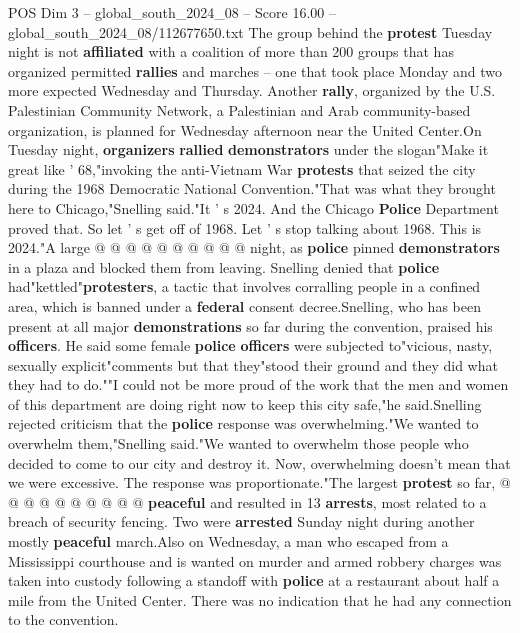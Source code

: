 \begin{textsample}{POS Dim 3 – global\_south\_2024\_08 – Score 16.00 – global\_south\_2024\_08/112677650.txt}
The group behind the \textbf{protest} Tuesday night is not \textbf{affiliated} with a coalition of more than 200 groups that has organized permitted \textbf{rallies} and marches -- one that took place Monday and two more expected Wednesday and Thursday.
Another \textbf{rally}, organized by the U.S.
Palestinian Community Network, a Palestinian and Arab community-based organization, is planned for Wednesday afternoon near the United Center.On Tuesday night, \textbf{organizers} \textbf{rallied} \textbf{demonstrators} under the slogan"Make it great like ' 68,"invoking the anti-Vietnam War \textbf{protests} that seized the city during the 1968 Democratic National Convention."That was what they brought here to Chicago,"Snelling said."It ' s 2024.
And the Chicago \textbf{Police} Department proved that.
So let ' s get off of 1968.
Let ' s stop talking about 1968.
This is 2024."A large @ @ @ @ @ @ @ @ @ @ night, as \textbf{police} pinned \textbf{demonstrators} in a plaza and blocked them from leaving.
Snelling denied that \textbf{police} had"kettled"\textbf{protesters}, a tactic that involves corralling people in a confined area, which is banned under a \textbf{federal} consent decree.Snelling, who has been present at all major \textbf{demonstrations} so far during the convention, praised his \textbf{officers}.
He said some female \textbf{police} \textbf{officers} were subjected to"vicious, nasty, sexually explicit"comments but that they"stood their ground and they did what they had to do.""I could not be more proud of the work that the men and women of this department are doing right now to keep this city safe,"he said.Snelling rejected criticism that the \textbf{police} response was overwhelming."We wanted to overwhelm them,"Snelling said."We wanted to overwhelm those people who decided to come to our city and destroy it.
Now, overwhelming doesn't mean that we were excessive.
The response was proportionate."The largest \textbf{protest} so far, @ @ @ @ @ @ @ @ @ @ \textbf{peaceful} and resulted in 13 \textbf{arrests}, most related to a breach of security fencing.
Two were \textbf{arrested} Sunday night during another mostly \textbf{peaceful} march.Also on Wednesday, a man who escaped from a Mississippi courthouse and is wanted on murder and armed robbery charges was taken into custody following a standoff with \textbf{police} at a restaurant about half a mile from the United Center.
There was no indication that he had any connection to the convention.

\end{textsample}
